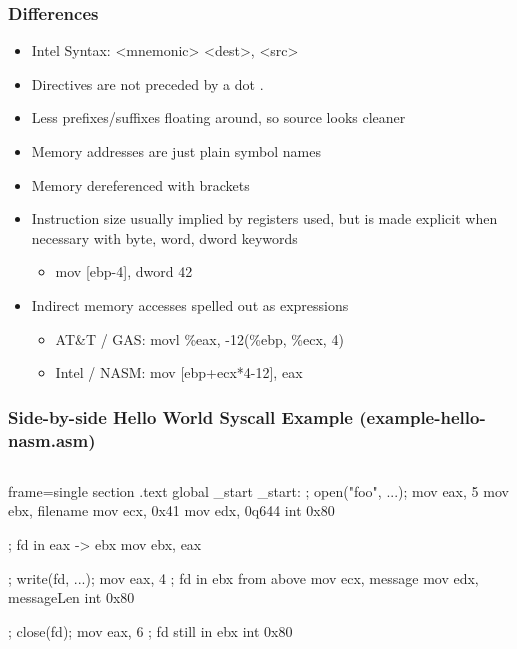\documentclass[11pt,xcolor=dvipsnames]{beamer}
\newcommand{\vs}{\vspace{0.5em}}
\newcommand{\mvs}{\vspace{-0.95em}}
\begin{document}
\begin{frame}[fragile,t]
\frametitle{Differences}
\begin{itemize}
  \item Intel Syntax: {\ttfamily <mnemonic> <dest>, <src>}
  \item Directives are not preceded by a dot {\ttfamily .}
  \item Less prefixes/suffixes floating around, so source looks cleaner
  \pause
  \item Memory addresses are just plain symbol names
  \item Memory dereferenced with brackets {\ttfamily [ ... ]}
  \pause
  \item Instruction size usually implied by registers used, but is made explicit when necessary with {\ttfamily byte, word, dword} keywords
  \begin{itemize}
    \item {\ttfamily mov [ebp-4], dword 42}
  \end{itemize}
  \vs
  \pause
  \item Indirect memory accesses spelled out as expressions
  \begin{itemize}
    \item AT\&T / GAS: {\ttfamily movl \%eax, -12(\%ebp, \%ecx, 4)}
    \item Intel / NASM: {\ttfamily mov [ebp+ecx*4-12], eax}
  \end{itemize}
\end{itemize}
\end{frame}

\begin{frame}[fragile,t]
\frametitle{Side-by-side Hello World Syscall Example (example-hello-nasm.asm)}
\mvs \mvs
\begin{columns}[T]
\begin{nasmcode*}{frame=single}
section .text
global _start
_start:
  ; open("foo", ...);
  mov eax, 5
  mov ebx, filename
  mov ecx, 0x41
  mov edx, 0q644
  int 0x80

  ; fd in eax -> ebx
  mov ebx, eax

  ; write(fd, ...);
  mov eax, 4
  ; fd in ebx from above
  mov ecx, message
  mov edx, messageLen
  int 0x80

  ; close(fd);
  mov eax, 6
  ; fd still in ebx
  int 0x80
\end{nasmcode*}
\end{columns}
\end{frame}
\end{document}
